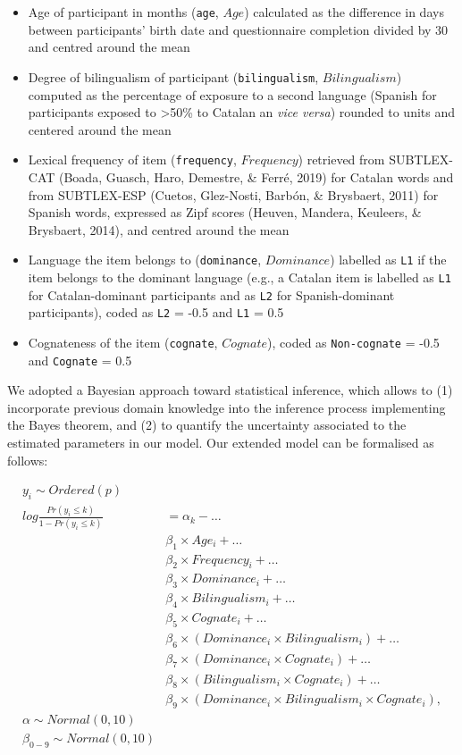 \documentclass[
  english,
  man,man,floatsintext]{apa6}
\providecommand{\tightlist}{%
  \setlength{\itemsep}{0pt}\setlength{\parskip}{0pt}}
\begin{document}
\begin{itemize}
\tightlist
\item
  Age of participant in months (\texttt{age}, \(Age\)) calculated as the difference in days between participants' birth date and questionnaire completion divided by 30 and centred around the mean
\item
  Degree of bilingualism of participant (\texttt{bilingualism}, \(Bilingualism\)) computed as the percentage of exposure to a second language (Spanish for participants exposed to \textgreater50\% to Catalan an \emph{vice versa}) rounded to units and centered around the mean
\item
  Lexical frequency of item (\texttt{frequency}, \(Frequency\)) retrieved from SUBTLEX-CAT (Boada, Guasch, Haro, Demestre, \& Ferré, 2019) for Catalan words and from SUBTLEX-ESP (Cuetos, Glez-Nosti, Barbón, \& Brysbaert, 2011) for Spanish words, expressed as Zipf scores (Heuven, Mandera, Keuleers, \& Brysbaert, 2014), and centred around the mean
\item
  Language the item belongs to (\texttt{dominance}, \(Dominance\)) labelled as \texttt{L1} if the item belongs to the dominant language (e.g., a Catalan item is labelled as \texttt{L1} for Catalan-dominant participants and as \texttt{L2} for Spanish-dominant participants), coded as \texttt{L2} = -0.5 and \texttt{L1} = 0.5
\item
  Cognateness of the item (\texttt{cognate}, \(Cognate\)), coded as \texttt{Non-cognate} = -0.5 and \texttt{Cognate} = 0.5
\end{itemize}

We adopted a Bayesian approach toward statistical inference, which allows to (1) incorporate previous domain knowledge into the inference process implementing the Bayes theorem, and (2) to quantify the uncertainty associated to the estimated parameters in our model. Our extended model can be formalised as follows:

\[
\begin{aligned}
y_i \sim Ordered(p) \\
log\frac{Pr(y_i \leq k)}{1-Pr(y_i \leq k)} &= \alpha_k - \dots \\
& \beta_1 \times Age_i + \dots \\
& \beta_2 \times Frequency_i + \dots \\
& \beta_3 \times Dominance_i + \dots \\
& \beta_4 \times Bilingualism_i + \dots \\
& \beta_5 \times Cognate_i + \dots \\
& \beta_6 \times (Dominance_i \times Bilingualism_i) + \dots \\
& \beta_7 \times (Dominance_i \times Cognate_i) + \dots \\
& \beta_8 \times (Bilingualism_i \times Cognate_i) + \dots \\
& \beta_9 \times (Dominance_i \times Bilingualism_i \times Cognate_i), \\
\alpha \sim Normal(0, 10) \\
\beta_{0-9} \sim Normal(0, 10)
\end{aligned}
\]
\end{document}
